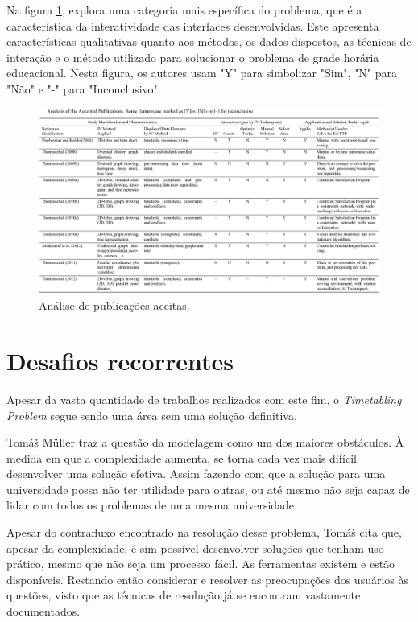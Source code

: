 Na figura \ref{Visualization}, \cite{alencar_visualization_2019} explora uma categoria mais específica do problema, que é a característica da interatividade das interfaces desenvolvidas. Este apresenta características qualitativas quanto aos métodos, os dados dispostos, as técnicas de interação e o método utilizado para solucionar o problema de grade horária educacional. Nesta figura, os autores usam "Y" para simbolizar "Sim", "N" para "Não" e "-" para "Inconclusivo".

\begin{figure}[htbp]\centering
    \caption{\label{Visualization}Análise de publicações aceitas.}
    \includegraphics[angle=0,scale=0.7]{files/img/tabelas/Visualization.png}
\end{figure}    %

\section{Desafios recorrentes} %

Apesar da vasta quantidade de trabalhos realizados com este fim, o \textit{Timetabling Problem} segue sendo uma área sem uma solução definitiva.

Tomáš Müller \cite{burke_modeling_2007} traz a questão da modelagem como um dos maiores obstáculos. À medida em que a complexidade aumenta, se torna cada vez mais difícil desenvolver uma solução efetiva. Assim fazendo com que a solução para uma universidade possa não ter utilidade para outras, ou até mesmo não seja capaz de lidar com todos os problemas de uma mesma universidade.

Apesar do contrafluxo encontrado na resolução desse problema, Tomáš cita que, apesar da complexidade, é sim possível desenvolver soluções que tenham uso prático, mesmo que não seja um processo fácil. As ferramentas existem e estão disponíveis. Restando então considerar e resolver as preocupações dos usuários às questões, visto que as técnicas de resolução já se encontram vastamente documentados.


